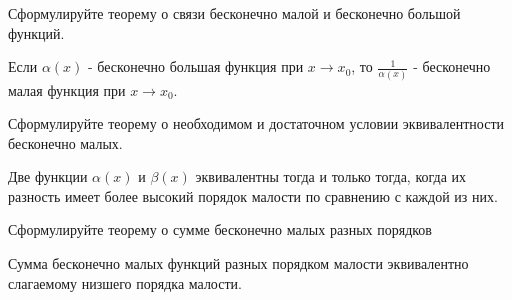 \begin{question}
  Сформулируйте теорему о связи бесконечно малой и бесконечно большой функций.
\end{question}
\begin{answer}
  Если $\alpha(x)$ - бесконечно большая функция при $x \to x_0$, то $\frac{1}{\alpha(x)}$ - бесконечно малая функция при $x \to x_0$.  
\end{answer}

\begin{question}
  Сформулируйте теорему о необходимом и достаточном условии эквивалентности бесконечно малых.
\end{question}
\begin{answer}
  Две функции $\alpha(x)$ и $\beta(x)$ эквивалентны тогда и только тогда, когда их разность имеет более высокий порядок малости по сравнению с каждой из них.
\end{answer}

\begin{question}
  Сформулируйте теорему о сумме бесконечно малых разных порядков
\end{question}
\begin{answer}
  Сумма бесконечно малых функций разных порядком малости эквивалентно слагаемому низшего порядка малости.
\end{answer}


